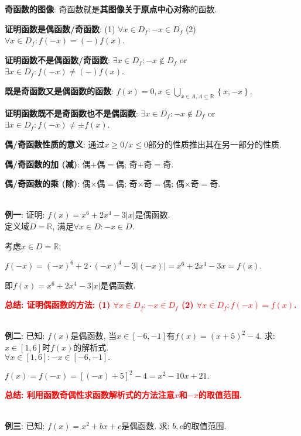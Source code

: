 \documentclass[8pt]{article}
\begin{document}
				\textbf{奇函数的图像}: 奇函数就是\textbf{其图像关于原点中心对称}的函数.

				\textbf{证明函数是偶函数/奇函数}: (1) $\forall x\in D_f: -x\in D_f$ (2) $\forall x\in D_f: f(-x)=(-)f(x)$.

				\textbf{证明函数不是偶函数/奇函数}: $\exists x\in D_f: -x\notin D_f$ or $\exists x\in D_f: f(-x)\neq (-)f(x)$.

				\textbf{既是奇函数又是偶函数的函数}: $f(x)=0, \displaystyle x\in\bigcup_{x\in A, A \subseteq \mathbb{R}} \left\{x, -x\right\}.$

				\textbf{证明函数既不是奇函数也不是偶函数}: $\exists x\in D_f: -x\notin D_f$ or $\exists x\in D_f: f(-x)\neq \pm f(x)$.

				\textbf{偶/奇函数性质的意义}: 通过$x\geq 0 / x\leq 0$部分的性质推出其在另一部分的性质.

				\textbf{偶/奇函数的加 (减)}: 偶$+$偶$=$偶; 奇$+$奇$=$奇.

				\textbf{偶/奇函数的乘 (除)}: 偶$\times$偶$=$偶; 奇$\times$奇$=$偶; 偶$\times$奇$=$奇.

				~\\

				\textbf{例一}: 证明: $f(x)=x^6+2x^4-3|x|$是偶函数.
					~\\

					定义域$D=\mathbb{R}$, 满足$\forall x\in D: -x \in D$.

					考虑$x\in D=\mathbb{R}$,

					$f(-x)=(-x)^6+2\cdot (-x)^4-3|(-x)|=x^6+2x^4-3x=f(x)$.

					即$f(x)=x^6+2x^4-3|x|$是偶函数.

					\textbf{\textcolor{red}{总结: 证明偶函数的方法: (1) $\forall x\in D_f: -x\in D_f$ (2) $\forall x\in D_f: f(-x)=f(x)$.}}

				~\\

				\textbf{例二}: 已知: $f(x)$是偶函数, 当$x\in[-6, -1]$有$f(x)=(x+5)^2-4$. 求: $x\in[1, 6]$时$f(x)$的解析式.
					~\\

					$\forall x\in[1, 6]: -x\in[-6, -1].$

					$f(x)=f(-x)=[(-x)+5]^2-4=x^2-10x+21.$

					\textbf{\textcolor{red}{总结: 利用函数奇偶性求函数解析式的方法注意$x$和$-x$的取值范围.}}

				~\\

				\textbf{例三}: 已知: $f(x)=x^2+bx+c$是偶函数. 求: $b, c$的取值范围.
					~\\
\end{document}
